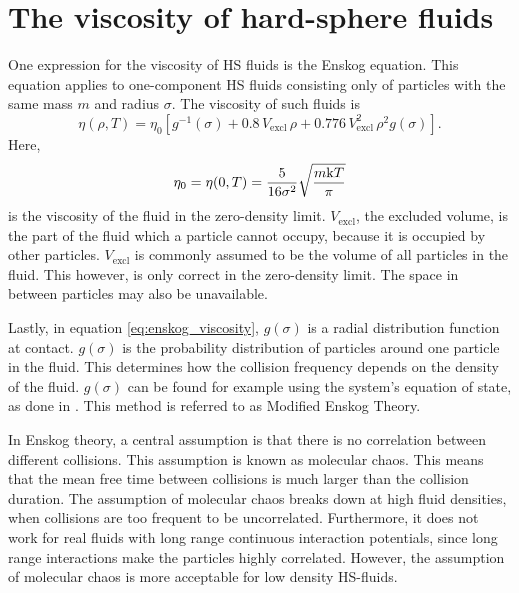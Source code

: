 \section{The viscosity of hard-sphere fluids}
One expression for the viscosity of HS fluids 
is the Enskog equation. This equation applies 
to one-component HS fluids consisting only of 
particles with the same mass $m$ and radius 
$\sigma$. The viscosity of such fluids is 
\cite{ref:pippo:composition_dependence}
\[
    \label{eq:enskog_viscosity}
    \eta(\rho,T) 
        = \eta_0 \left[g^{-1}(\sigma) 
        + 0.8\, V_{\text{excl}}\,\rho 
        + 0.776 \,V_{\text{excl}}^2 \,\rho^2 g(\sigma) 
        \right].
\]
Here, 
\[
    \eta_0 = \eta(0, T) = 
    \frac{5}{16\sigma^2} \sqrt{\frac{m \mathrm{k} T}{\pi}}
\]
is the viscosity of the fluid in the zero-density 
limit. $V_{\text{excl}}$, the excluded volume, 
is the part of the fluid which a particle cannot 
occupy, because it is occupied by other particles. 
$V_{\text{excl}}$ is commonly assumed to be the 
volume of all particles in the fluid. This however, 
is only correct in the zero-density limit. 
The space in between particles may also be unavailable.

Lastly, in equation \eqref{eq:enskog_viscosity}, 
$g(\sigma)$ is a radial distribution function at 
contact.  $g(\sigma)$ is the probability distribution 
of particles around one particle in the fluid. 
This determines how the collision frequency depends 
on the density of the fluid. $g(\sigma)$ can be 
found for example using the system's equation of 
state, as done in \cite{ref:pippo:composition_dependence}.
This method is referred to as Modified Enskog Theory.


In Enskog theory, a central assumption is that 
there is no correlation between different collisions. 
This assumption is known as molecular chaos. 
This means that the mean free time between 
collisions is much larger than the collision 
duration. The assumption of molecular chaos 
breaks down at high fluid densities, when 
collisions are too frequent to be uncorrelated. 
Furthermore, it does not work for real fluids 
with long range continuous interaction potentials,
since long range interactions make the particles 
highly correlated. However, the assumption of 
molecular chaos is more acceptable for low 
density HS-fluids. 


